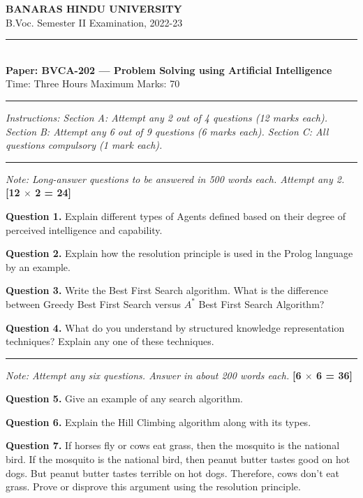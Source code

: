 \documentclass[11pt,a4paper]{article}
\begin{document}
\begin{center}
  {\large\bfseries BANARAS HINDU UNIVERSITY}\\[2pt]
  {\normalsize B.Voc. Semester II Examination, 2022-23}\\[6pt]
  \rule{0.8\linewidth}{0.5pt}\\[6pt]
  {\large\bfseries Paper: BVCA-202 --- Problem Solving using Artificial Intelligence}\\[4pt]
  {\normalsize Time: Three Hours \hfill Maximum Marks: 70}
\end{center}

\rule{\linewidth}{0.4pt}

\smallskip
\noindent\textit{Instructions: Section A: Attempt any 2 out of 4 questions (12 marks each). Section B: Attempt any 6 out of 9 questions (6 marks each). Section C: All questions compulsory (1 mark each).}

\bigskip

\bigskip{}
\rule{\linewidth}{0.4pt}\smallskip

\noindent\textit{Note: Long-answer questions to be answered in 500 words each. Attempt any 2.} \hfill \textbf{[12 $\times$ 2 = 24]}

\medskip\noindent\textbf{Question 1.} Explain different types of Agents defined based on their degree of perceived intelligence and capability.

\medskip\noindent\textbf{Question 2.} Explain how the resolution principle is used in the Prolog language by an example.

\medskip\noindent\textbf{Question 3.} Write the Best First Search algorithm. What is the difference between Greedy Best First Search versus $A^*$ Best First Search Algorithm?

\medskip\noindent\textbf{Question 4.} What do you understand by structured knowledge representation techniques? Explain any one of these techniques.

\bigskip{}
\rule{\linewidth}{0.4pt}\smallskip

\noindent\textit{Note: Attempt any six questions. Answer in about 200 words each.} \hfill \textbf{[6 $\times$ 6 = 36]}

\medskip\noindent\textbf{Question 5.} Give an example of any search algorithm.

\medskip\noindent\textbf{Question 6.} Explain the Hill Climbing algorithm along with its types.

\medskip\noindent\textbf{Question 7.} If horses fly or cows eat grass, then the mosquito is the national bird. If the mosquito is the national bird, then peanut butter tastes good on hot dogs. But peanut butter tastes terrible on hot dogs. Therefore, cows don't eat grass. Prove or disprove this argument using the resolution principle.
\end{document}
